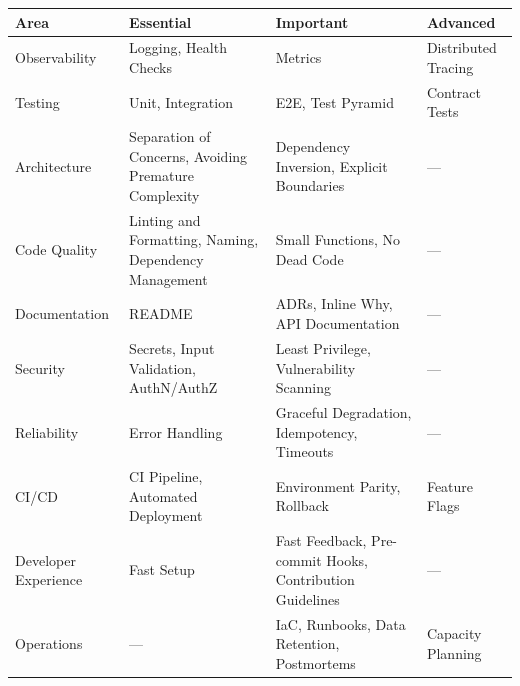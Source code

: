 {\def\LTcaptype{none} %
\begin{longtable}[]{@{}
  >{\raggedright\arraybackslash}p{}
  >{\raggedright\arraybackslash}p{}
  >{\raggedright\arraybackslash}p{}
  >{\raggedright\arraybackslash}p{}@{}}
\toprule\noalign{}
\begin{minipage}[b]{\linewidth}\raggedright
Area
\end{minipage} & \begin{minipage}[b]{\linewidth}\raggedright
Essential
\end{minipage} & \begin{minipage}[b]{\linewidth}\raggedright
Important
\end{minipage} & \begin{minipage}[b]{\linewidth}\raggedright
Advanced
\end{minipage} \\
\midrule\noalign{}
\endhead
\bottomrule\noalign{}
\endlastfoot
Observability & Logging, Health Checks & Metrics & Distributed Tracing \\
Testing & Unit, Integration & E2E, Test Pyramid & Contract Tests \\
Architecture & Separation of Concerns, Avoiding Premature Complexity & Dependency Inversion, Explicit Boundaries & --- \\
Code Quality & Linting and Formatting, Naming, Dependency Management & Small Functions, No Dead Code & --- \\
Documentation & README & ADRs, Inline Why, API Documentation & --- \\
Security & Secrets, Input Validation, AuthN/AuthZ & Least Privilege, Vulnerability Scanning & --- \\
Reliability & Error Handling & Graceful Degradation, Idempotency, Timeouts & --- \\
CI/CD & CI Pipeline, Automated Deployment & Environment Parity, Rollback & Feature Flags \\
Developer Experience & Fast Setup & Fast Feedback, Pre-commit Hooks, Contribution Guidelines & --- \\
Operations & --- & IaC, Runbooks, Data Retention, Postmortems & Capacity Planning \\
\end{longtable}
}

\label{writing-good-code:gaps-and-domain-specific-considerations}

